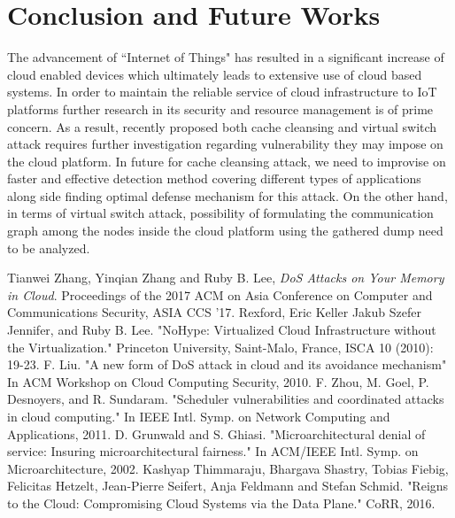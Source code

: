 \documentclass[a4paper,10pt]{article}
\begin{document}
\section{Conclusion and Future Works}
The advancement of “Internet of Things" has resulted in a significant increase of cloud enabled devices which ultimately leads to extensive use of cloud based systems. In order to maintain the reliable service of cloud infrastructure to IoT platforms further research in its security and resource management is of prime concern. As a result, recently proposed both cache cleansing and virtual switch attack requires further investigation regarding vulnerability they may impose on the cloud platform. In future for cache cleansing attack, we need to improvise on faster and effective detection method covering different types of applications along side finding optimal defense mechanism for this attack. On the other hand, in terms of virtual switch attack, possibility of formulating the communication graph among the nodes inside the cloud platform using the gathered dump need to be analyzed. 


\begin{thebibliography}{9}
Tianwei Zhang, Yinqian Zhang and Ruby B. Lee,  \textit{DoS Attacks on Your Memory in Cloud}. Proceedings of the 2017 ACM on Asia Conference on Computer and Communications Security, ASIA CCS '17.
 Rexford, Eric Keller Jakub Szefer Jennifer, and Ruby B. Lee. "NoHype: Virtualized Cloud Infrastructure without the Virtualization." Princeton University, Saint-Malo, France, ISCA 10 (2010): 19-23.
 F. Liu. "A new form of DoS attack in cloud and its avoidance mechanism" In ACM Workshop on Cloud Computing Security, 2010.
 F. Zhou, M. Goel, P. Desnoyers, and R. Sundaram. "Scheduler vulnerabilities and coordinated attacks in cloud computing." In IEEE Intl. Symp. on Network Computing and Applications, 2011.
 D. Grunwald and S. Ghiasi. "Microarchitectural denial
of service:  Insuring microarchitectural fairness." In ACM/IEEE Intl. Symp. on Microarchitecture, 2002.
 Kashyap Thimmaraju,
               Bhargava Shastry,
               Tobias Fiebig,
               Felicitas Hetzelt,
               Jean{-}Pierre Seifert,
               Anja Feldmann and
               Stefan Schmid. "Reigns to the Cloud: Compromising Cloud Systems via the Data Plane." CoRR, 2016.
\end{thebibliography}
\end{document}
